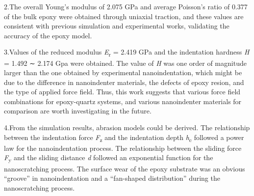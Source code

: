 \documentclass{article}
\begin{document}
\begin{hangpars}
2.\quad The overall Young’s modulus of 2.075 GPa and average Poisson’s ratio of 0.377 of the bulk epoxy were obtained through uniaxial traction, and these values are consistent with previous simulation and experimental works, validating the accuracy of the epoxy model.

3.\quad Values of the reduced modulus \emph{E}\textsubscript{r} = 2.419 GPa and the indentation hardness \emph{H} = 1.492 ∼ 2.174 Gpa were obtained. The value of \emph{H} was one order of magnitude larger than the one obtained by experimental nanoindentation, which might be due to the difference in nanoindenter materials, the defects of epoxy resion, and the type of applied force field. Thus, this work suggests that various force field combinations for epoxy-quartz systems, and various nanoindenter materials for comparison are worth investigating in the future.

4.\quad From the simulation results, abrasion models could be derived. The relationship between the indentation force \emph{F}\textsubscript{z} and the indentation depth \emph{h}\textsubscript{c} followed a power law for the nanoindentation process. The relationship between the sliding force \emph{F}\textsubscript{y} and the sliding distance \emph{d} followed an exponential function for the nanoscratching process. The surface wear of the epoxy substrate was an obvious “groove” in nanoindentation and a “fan-shaped distribution” during the nanoscratching process.
\end{hangpars}
\end{document}
